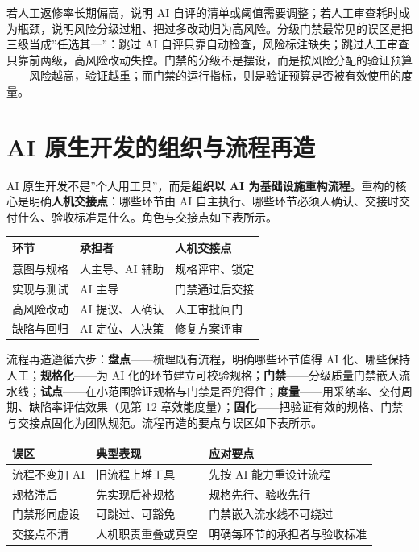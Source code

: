 \documentclass[12pt,a4paper,twoside,openany]{ctexbook}
\numberwithin{figure}{chapter}
\numberwithin{table}{chapter}
\newcounter{none}
\begin{document}
若人工返修率长期偏高，说明 AI
自评的清单或阈值需要调整；若人工审查耗时成为瓶颈，说明风险分级过粗、把过多改动归为高风险。分级门禁最常见的误区是把三级当成''任选其一''：跳过
AI
自评只靠自动检查，风险标注缺失；跳过人工审查只靠前两级，高风险改动失控。门禁的分级不是摆设，而是按风险分配的验证预算------风险越高，验证越重；而门禁的运行指标，则是验证预算是否被有效使用的度量。

\section{AI
原生开发的组织与流程再造}\label{ai-ux539fux751fux5f00ux53d1ux7684ux7ec4ux7ec7ux4e0eux6d41ux7a0bux518dux9020}

AI 原生开发不是''个人用工具''，而是\textbf{组织以 AI
为基础设施重构流程}。重构的核心是明确\textbf{人机交接点}：哪些环节由 AI
自主执行、哪些环节必须人确认、交接时交付什么、验收标准是什么。角色与交接点如下表所示。

{\def\LTcaptype{none} %
\begin{longtable}[]{@{}lll@{}}
\toprule\noalign{}
环节 & 承担者 & 人机交接点 \\
\midrule\noalign{}
\endhead
\bottomrule\noalign{}
\endlastfoot
意图与规格 & 人主导、AI 辅助 & 规格评审、锁定 \\
实现与测试 & AI 主导 & 门禁通过后交接 \\
高风险改动 & AI 提议、人确认 & 人工审批闸门 \\
缺陷与回归 & AI 定位、人决策 & 修复方案评审 \\
\end{longtable}
}

流程再造遵循六步：\textbf{盘点}------梳理既有流程，明确哪些环节值得 AI
化、哪些保持人工；\textbf{规格化}------为 AI
化的环节建立可校验规格；\textbf{门禁}------分级质量门禁嵌入流水线；\textbf{试点}------在小范围验证规格与门禁是否兜得住；\textbf{度量}------用采纳率、交付周期、缺陷率评估效果（见第
12
章效能度量）；\textbf{固化}------把验证有效的规格、门禁与交接点固化为团队规范。流程再造的要点与误区如下表所示。

{\def\LTcaptype{none} %
\begin{longtable}[]{@{}lll@{}}
\toprule\noalign{}
误区 & 典型表现 & 应对要点 \\
\midrule\noalign{}
\endhead
\bottomrule\noalign{}
\endlastfoot
流程不变加 AI & 旧流程上堆工具 & 先按 AI 能力重设计流程 \\
规格滞后 & 先实现后补规格 & 规格先行、验收先行 \\
门禁形同虚设 & 可跳过、可豁免 & 门禁嵌入流水线不可绕过 \\
交接点不清 & 人机职责重叠或真空 & 明确每环节的承担者与验收标准 \\
\end{longtable}
}
\end{document}
